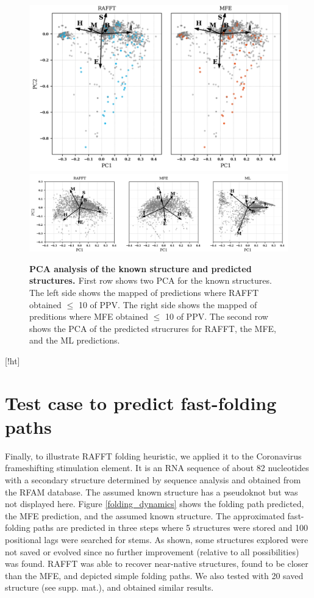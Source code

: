 \documentclass[a4paper,12pt]{article}
\begin{document}
{{\begin{figure}[!ht]
  \centering
  \includegraphics[scale=0.5]{img/pca_known.png}\\
  \includegraphics[scale=0.7]{img/pca_predicted.png} 
  \caption{\textbf{PCA analysis of the known structure and predicted structures. \label{pca_struct}}
    First row shows two PCA for the known structures.
    The left side shows the mapped of predictions where RAFFT obtained $\leq$ 10 of PPV.
    The right side shows the mapped of preditions where MFE obtained $\leq$ 10 of PPV.
    The second row shows the PCA of the predicted strucrures for RAFFT, the MFE, and the ML predictions.}
\end{figure}[!ht]

\clearpage
\section{Test case to predict fast-folding paths}
\label{sec:org74ed67c}
Finally, to illustrate RAFFT folding heuristic, we applied it to the Coronavirus
frameshifting stimulation element. It is an RNA sequence of about 82 nucleotides
with a secondary structure determined by sequence analysis and obtained from the
RFAM database. The assumed known structure has a pseudoknot but was not
displayed here. Figure \ref{folding_dynamics} shows the folding path predicted,
the MFE prediction, and the assumed known structure. The approximated
fast-folding paths are predicted in three steps where 5 structures were stored
and 100 positional lags were searched for stems. As shown, some structures
explored were not saved or evolved since no further improvement (relative to all
possibilities) was found. RAFFT was able to recover near-native structures,
found to be closer than the MFE, and depicted simple folding paths. We also
tested with 20 saved structure (see supp. mat.), and obtained similar results.

}}
\end{document}
